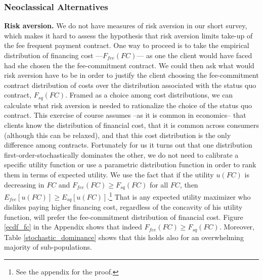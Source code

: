 \documentclass[oneside,11pt]{article}
\begin{document}
\subsubsection{Neoclassical Alternatives} \label{neoclasical}

\vspace{.1in}
\noindent \textbf{Risk aversion.} We do not have measures of risk aversion in our short survey, which makes it hard to assess the hypothesis that risk aversion limits take-up of the fee frequent payment contract. One way to proceed is to take the empirical distribution of financing cost ---$F_{fee}(FC)$--- as one the client would have faced had she chosen the the fee-commitment contract. We could then ask what would risk aversion have to be in order to justify the client choosing the fee-commitment contract distribution of costs over the distribution associated with the status quo contract, $F_{sq}(FC)$. Framed as a choice among cost distributions, we can calculate what risk aversion is needed to rationalize the choice of the status quo contract. This exercise of course assumes --as it is common in economics-- that clients know the distribution of financial cost, that it is common across consumers (although this can be relaxed), and that this cost distribution is the only difference among contracts. Fortunately for us it turns out that one distribution first-order-stochastically dominates the other, we do not need to calibrate a specific utility function or use a parametric distribution function in order to rank them in terms of expected utility. We use the fact that if the utility $u(FC)$ is decreasing in $FC$ and $F_{fee}(FC) \geq F_{sq}(FC)$ for all $FC$, then $E_{fee}[u(FC)] \geq E_{sq}[u(FC)]$.\footnote{See the appendix for the proof.} That is any expected utility maximizer who dislikes paying higher financing cost, regardless of the concavity of his utility function, will prefer the fee-commitment distribution of financial cost.  Figure \ref{ecdf_fc} in the Appendix shows that indeed $F_{fee}(FC) \geq F_{sq}(FC)$. Moreover, Table \ref{stochastic_dominance} shows that this holds also for an overwhelming majority of sub-populations.

\end{document}
